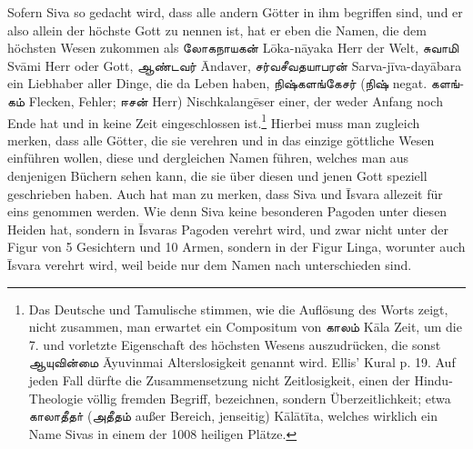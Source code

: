 \documentclass{article}
\newcommand{\TamilText}[1]{\texttamil{#1}}
\newcommand{\tam}[1]{\TamilText{#1}}
\begin{document}
Sofern Siva so gedacht wird, dass alle andern Götter in ihm begriffen sind, und er also allein der höchste Gott zu nennen ist, hat er eben die Namen, die dem höchsten Wesen zukommen als \tam{லோகநாயகன்} L\={o}ka-n\={a}yaka Herr der Welt, \tam{சுவாமி} Sv\={a}mi Herr oder Gott, \tam{ஆண்டவர்} \={A}ndaver, \tam{சர்வசீவதயாபரன்} Sarva-j\={i}va-day\={a}bara ein Liebhaber aller Dinge, die da Leben haben, \tam{நிஷ்களங்கேசர்} (\tam{நிஷ்} negat. \tam{களங்கம்} Flecken, Fehler; \tam{ஈசன்} Herr) Nischkalang\={e}ser einer, der weder Anfang noch Ende hat und in keine Zeit eingeschlossen ist.\footnote{Das Deutsche und Tamulische stimmen, wie die Auflösung des Worts zeigt, nicht zusammen, man erwartet ein Compositum von \tam{காலம்} K\={a}la Zeit, um die 7. und vorletzte Eigenschaft des höchsten Wesens auszudrücken, die sonst \tam{ஆயுவின்மை} \={A}yuvinmai Alterslosigkeit genannt wird. Ellis' Kural p. 19. Auf jeden Fall dürfte die Zusammensetzung nicht Zeitlosigkeit, einen der Hindu-Theologie völlig fremden Begriff, bezeichnen, sondern Überzeitlichkeit; etwa \tam{காலாதீதா்} (\tam{அதீதம்} außer Bereich, jenseitig) K\={a}l\={a}t\={i}ta, welches wirklich ein Name Sivas in einem der 1008 heiligen Plätze.} Hierbei muss man zugleich merken, dass alle Götter, die sie verehren und in das einzige göttliche Wesen einführen wollen, diese und dergleichen Namen führen, welches man aus denjenigen Büchern sehen kann, die sie über diesen und jenen Gott speziell geschrieben haben. Auch hat man zu merken, dass Siva und \={I}svara allezeit für eins genommen werden. Wie denn Siva keine besonderen Pagoden unter diesen Heiden hat, sondern in \={I}svaras Pagoden verehrt wird, und zwar nicht unter der Figur von 5 Gesichtern und 10 Armen, sondern in der Figur Linga, worunter auch \={I}svara verehrt wird, weil beide nur dem Namen nach unterschieden sind.
\end{document}
